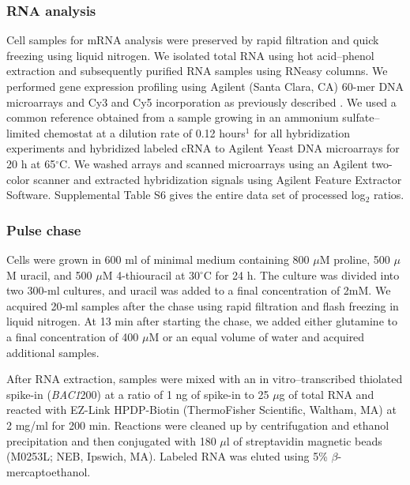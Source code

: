 \subsubsection{RNA analysis} 

Cell samples for
mRNA analysis were preserved by rapid filtration and quick freezing
using liquid nitrogen. We isolated total RNA using hot acid–phenol
extraction and subsequently purified RNA samples using RNeasy columns.
We performed gene expression profiling using Agilent (Santa Clara, CA)
60-mer DNA microarrays and Cy3 and Cy5 incorporation as previously
described 
\parencite{brauer2008coordination}. We used a common reference obtained
from a sample growing in an ammonium sulfate–limited chemostat at a
dilution rate of 0.12 hours$^1$ for all hybridization experiments and
hybridized labeled cRNA to Agilent Yeast DNA microarrays for 20 h at
65$^{\circ}$C. We washed arrays and scanned microarrays using an Agilent
two-color scanner and extracted hybridization signals using Agilent
Feature Extractor Software. Supplemental Table S6 gives the entire
data set of processed log$_2$ ratios.  

\subsubsection{Pulse chase} 

Cells were grown in
600 ml of minimal medium containing 800 $\mu$M proline, 500 $\mu$M uracil, and
500 $\mu$M 4-thiouracil at 30$^{\circ}$C for 24 h. The culture was divided into two
300-ml cultures, and uracil was added to a final concentration of 2mM. 
We acquired 20-ml samples after the chase using rapid filtration
and flash freezing in liquid nitrogen. At 13 min after starting the
chase, we added either glutamine to a final concentration of 400 $\mu$M or
an equal volume of water and acquired additional samples.  

After RNA
extraction, samples were mixed with an in vitro–transcribed thiolated
spike-in (\textit{BAC1}200) at a ratio of 1 ng of spike-in to 25 $\mu$g of total
RNA and reacted with EZ-Link HPDP-Biotin (ThermoFisher Scientific,
Waltham, MA) at 2 mg/ml for 200 min. Reactions were cleaned up by
centrifugation and ethanol precipitation and then conjugated with 180
$\mu$l of streptavidin magnetic beads (M0253L; NEB, Ipswich, MA). Labeled
RNA was eluted using 5\% $\beta$-mercaptoethanol.  

